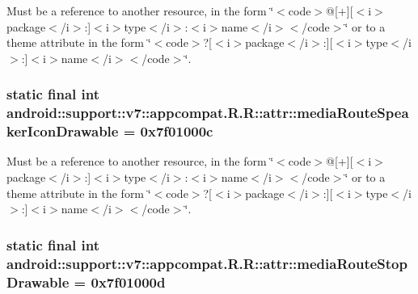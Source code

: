 Must be a reference to another resource, in the form \char`\"{}$<$code$>$@\mbox{[}+\mbox{]}\mbox{[}$<$i$>$package$<$/i$>$:\mbox{]}$<$i$>$type$<$/i$>$:$<$i$>$name$<$/i$>$$<$/code$>$\char`\"{} or to a theme attribute in the form \char`\"{}$<$code$>$?\mbox{[}$<$i$>$package$<$/i$>$:\mbox{]}\mbox{[}$<$i$>$type$<$/i$>$:\mbox{]}$<$i$>$name$<$/i$>$$<$/code$>$\char`\"{}. \hypertarget{classandroid_1_1support_1_1v7_1_1appcompat_1_1_r_1_1attr_1861497a9bef812eb9a46cdead921c7f}{
\subsubsection[{mediaRouteSpeakerIconDrawable}]{\setlength{\rightskip}{0pt plus 5cm}static final int android::support::v7::appcompat.R.R::attr::mediaRouteSpeakerIconDrawable = 0x7f01000c}}
\label{classandroid_1_1support_1_1v7_1_1appcompat_1_1_r_1_1attr_1861497a9bef812eb9a46cdead921c7f}


Must be a reference to another resource, in the form \char`\"{}$<$code$>$@\mbox{[}+\mbox{]}\mbox{[}$<$i$>$package$<$/i$>$:\mbox{]}$<$i$>$type$<$/i$>$:$<$i$>$name$<$/i$>$$<$/code$>$\char`\"{} or to a theme attribute in the form \char`\"{}$<$code$>$?\mbox{[}$<$i$>$package$<$/i$>$:\mbox{]}\mbox{[}$<$i$>$type$<$/i$>$:\mbox{]}$<$i$>$name$<$/i$>$$<$/code$>$\char`\"{}. \hypertarget{classandroid_1_1support_1_1v7_1_1appcompat_1_1_r_1_1attr_fb225e4c1d67fc60598e4d0ac33489b6}{
\subsubsection[{mediaRouteStopDrawable}]{\setlength{\rightskip}{0pt plus 5cm}static final int android::support::v7::appcompat.R.R::attr::mediaRouteStopDrawable = 0x7f01000d}}
\label{classandroid_1_1support_1_1v7_1_1appcompat_1_1_r_1_1attr_fb225e4c1d67fc60598e4d0ac33489b6}


